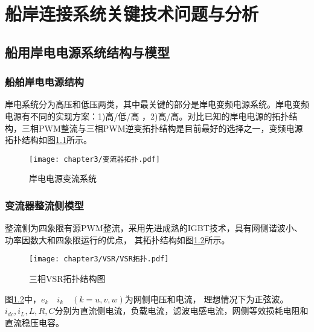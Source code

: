 \chapter{船岸连接系统关键技术问题与分析}

\section{船用岸电电源系统结构与模型}

\subsection{船舶岸电电源结构}

岸电系统分为高压和低压两类，其中最关键的部分是岸电变频电源系统。岸电变频电源有不同的实现方案：1)高/低/高
，2)高/高。对比已知的岸电电源的拓扑结构，三相PWM整流与三相PWM逆变拓扑结构是目前最好的选择之一，变频电源
拓扑结构如图\ref{fig:岸电电源变流系统}所示。

\begin{figure}[!htp]
	\centering
	\texttt{[image: chapter3/变流器拓扑.pdf]}
	\caption{岸电电源变流系统}
	\label{fig:岸电电源变流系统}
\end{figure}

\subsection{变流器整流侧模型}

整流侧为四象限有源PWM整流，采用先进成熟的IGBT技术，具有网侧谐波小、功率因数大和四象限运行的优点，
其拓扑结构如图\ref{fig:三相VSR拓扑结构图}所示。

\begin{figure}[!htp]
	\centering
	\texttt{[image: chapter3/VSR/VSR拓扑.pdf]}
	\caption{三相VSR拓扑结构图}
	\label{fig:三相VSR拓扑结构图}
\end{figure}

图\ref{fig:三相VSR拓扑结构图}中，$e_{k} \quad i_{k} \quad (k=u,v,w)$为网侧电压和电流，
理想情况下为正弦波。$i_{dc},i_{L},L,R,C$分别为直流侧电流，负载电流，滤波电感电流，网侧等效损耗电阻和
直流稳压电容。


